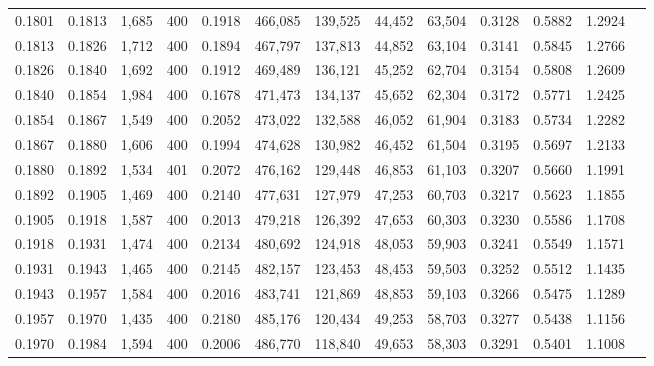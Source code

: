 \begin{tabular}{rrrrrrrrrrrrr}
0.1801 & 0.1813 &  1,685 & 400 &                                     0.1918 & 466,085 & 139,525 &  44,452 &  63,504 & 0.3128 & 0.5882 & 1.2924 \\
0.1813 & 0.1826 &  1,712 & 400 &                                     0.1894 & 467,797 & 137,813 &  44,852 &  63,104 & 0.3141 & 0.5845 & 1.2766 \\
0.1826 & 0.1840 &  1,692 & 400 &                                     0.1912 & 469,489 & 136,121 &  45,252 &  62,704 & 0.3154 & 0.5808 & 1.2609 \\
0.1840 & 0.1854 &  1,984 & 400 &                                     0.1678 & 471,473 & 134,137 &  45,652 &  62,304 & 0.3172 & 0.5771 & 1.2425 \\
0.1854 & 0.1867 &  1,549 & 400 &                                     0.2052 & 473,022 & 132,588 &  46,052 &  61,904 & 0.3183 & 0.5734 & 1.2282 \\
0.1867 & 0.1880 &  1,606 & 400 &                                     0.1994 & 474,628 & 130,982 &  46,452 &  61,504 & 0.3195 & 0.5697 & 1.2133 \\
0.1880 & 0.1892 &  1,534 & 401 &                                     0.2072 & 476,162 & 129,448 &  46,853 &  61,103 & 0.3207 & 0.5660 & 1.1991 \\
0.1892 & 0.1905 &  1,469 & 400 &                                     0.2140 & 477,631 & 127,979 &  47,253 &  60,703 & 0.3217 & 0.5623 & 1.1855 \\
0.1905 & 0.1918 &  1,587 & 400 &                                     0.2013 & 479,218 & 126,392 &  47,653 &  60,303 & 0.3230 & 0.5586 & 1.1708 \\
0.1918 & 0.1931 &  1,474 & 400 &                                     0.2134 & 480,692 & 124,918 &  48,053 &  59,903 & 0.3241 & 0.5549 & 1.1571 \\
0.1931 & 0.1943 &  1,465 & 400 &                                     0.2145 & 482,157 & 123,453 &  48,453 &  59,503 & 0.3252 & 0.5512 & 1.1435 \\
0.1943 & 0.1957 &  1,584 & 400 &                                     0.2016 & 483,741 & 121,869 &  48,853 &  59,103 & 0.3266 & 0.5475 & 1.1289 \\
0.1957 & 0.1970 &  1,435 & 400 &                                     0.2180 & 485,176 & 120,434 &  49,253 &  58,703 & 0.3277 & 0.5438 & 1.1156 \\
0.1970 & 0.1984 &  1,594 & 400 &                                     0.2006 & 486,770 & 118,840 &  49,653 &  58,303 & 0.3291 & 0.5401 & 1.1008 \\

\end{tabular}
